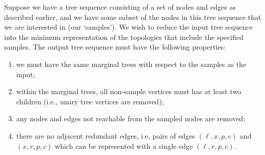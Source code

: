 \documentclass{article}
\begin{document}
Suppose we have a tree sequence consisting of a set of nodes and edges as
described earlier, and we have some subset of the nodes in this tree sequence
that we are interested in (our `samples').  We wish to reduce the input tree sequence
into the minimum representation of the topologies that include the specified
samples. The output tree sequence must have the following properties:
\begin{enumerate}
\item we must have the same marginal trees with respect to the samples as
the input;
\item within the marginal trees, all non-sample vertices must has at least
two children (i.e., unary tree vertices are removed);
\item any nodes and edges not reachable from the sampled nodes are removed;
\item there are no adjacent redundant edges, i.e, pairs of edges $(\ell, x, p,
c)$ and $(x, r, p, c)$ which can be represented with a single edge
$(\ell, r, p, c)$.
\end{enumerate}
\end{document}
